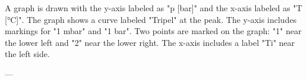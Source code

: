 A graph is drawn with the y-axis labeled as "p [bar]" and the x-axis labeled as "T [°C]". The graph shows a curve labeled "Tripel" at the peak. The y-axis includes markings for "1 mbar" and "1 bar". Two points are marked on the graph: "1" near the lower left and "2" near the lower right. The x-axis includes a label "Ti" near the left side.

---